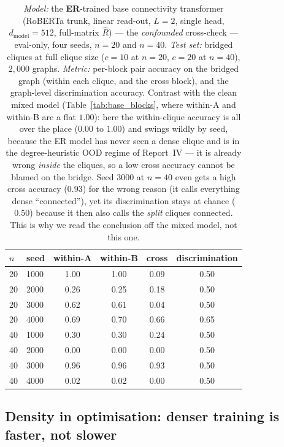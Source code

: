 \documentclass[11pt,a4paper]{article}
\begin{document}
\begin{table}[H]\centering\small
\begin{tabular}{llcccc}
\toprule
$n$ & seed & within-A & within-B & cross & discrimination \\
\midrule
20 & 1000 & 1.00 & 1.00 & 0.09 & 0.50 \\
20 & 2000 & 0.26 & 0.25 & 0.18 & 0.50 \\
20 & 3000 & 0.62 & 0.61 & 0.04 & 0.50 \\
20 & 4000 & 0.69 & 0.70 & 0.66 & 0.65 \\
40 & 1000 & 0.30 & 0.30 & 0.24 & 0.50 \\
40 & 2000 & 0.00 & 0.00 & 0.00 & 0.50 \\
40 & 3000 & 0.96 & 0.96 & 0.93 & 0.50 \\
40 & 4000 & 0.02 & 0.02 & 0.00 & 0.50 \\
\bottomrule
\end{tabular}
\caption{\emph{Model:} the \textbf{ER}-trained base connectivity transformer (RoBERTa trunk, linear
read-out, $L=2$, single head, $d_{\mathrm{model}}=512$, full-matrix $\hat R$) --- the
\emph{confounded} cross-check --- eval-only, four seeds, $n=20$ and $n=40$. \emph{Test set:} bridged
cliques at full clique size ($c=10$ at $n=20$, $c=20$ at $n=40$), $2{,}000$ graphs. \emph{Metric:}
per-block pair accuracy on the bridged graph (within each clique, and the cross block), and the
graph-level discrimination accuracy. Contrast with the clean mixed model (Table~\ref{tab:base_blocks},
where within-A and within-B are a flat $1.00$): here the within-clique accuracy is all over the place
($0.00$ to $1.00$) and swings wildly by seed, because the ER model has never seen a dense clique and
is in the degree-heuristic OOD regime of Report~IV --- it is already wrong \emph{inside} the cliques,
so a low cross accuracy cannot be blamed on the bridge. Seed $3000$ at $n=40$ even gets a high cross
accuracy ($0.93$) for the wrong reason (it calls everything dense ``connected''), yet its
discrimination stays at chance ($0.50$) because it then also calls the \emph{split} cliques
connected. This is why we read the conclusion off the mixed model, not this one.}
\label{tab:base_er}
\end{table}

\subsection{Density in optimisation: denser training is faster, not slower}
\label{sec:res-density}
\end{document}
